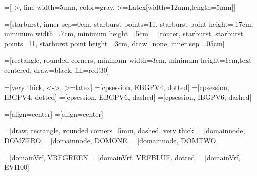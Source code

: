 =[->, line width=5mm, color=gray, >={Latex[width=12mm,length=5mm]}]

=[starburst, inner sep=0cm, starburst points=11, starburst point height=.17cm, minimum width=.7cm, minimum height=.5cm]
=[router, starburst, starburst points=11, starburst point height=.3cm, draw=none, inner sep=.05cm]

\tikzset{node distance=2cm}

=[rectangle, rounded corners, minimum width=3cm, minimum height=1cm,text centered, draw=black, fill=red!30]

=[very thick, <->, >=latex]
=[cpsession, EBGPV4, dotted]
=[cpsession, IBGPV4, dotted]
=[cpsession, EBGPV6, dashed]
=[cpsession, IBGPV6, dashed]


=[align=center]
=[align=center]

=[draw, rectangle, rounded corners=5mm, dashed, very thick]
=[domainnode, DOMZERO]
=[domainnode, DOMONE]
=[domainnode, DOMTWO]

=[domainVrf, VRFGREEN]
=[domainVrf, VRFBLUE, dotted]
=[domainVrf, EVI100]



\fi

